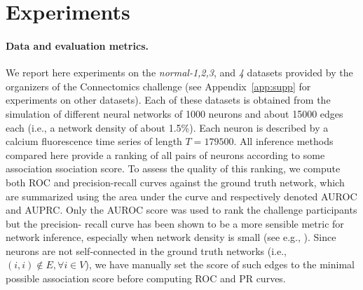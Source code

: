 \documentclass[wcp]{jmlr}
\begin{document}

\section{Experiments} \label{sec:results}


\paragraph{Data and evaluation metrics.}

We report here experiments on the \textit{normal-1,2,3}, and \textit{4}
datasets provided by the organizers of the Connectomics challenge (see
Appendix~\ref{app:supp} for experiments on other datasets). Each of
these datasets is obtained from the simulation \citep{stetter2012model} of
different neural networks of 1000 neurons and about 15000 edges each (i.e., a
network density of about 1.5\%). Each neuron is described by a calcium
fluorescence time series of length $T=179500$. All inference methods compared
here provide a ranking of all pairs of neurons according to some association
ssociation
score. To assess the quality of this ranking, we compute both ROC and
precision-recall curves against the ground truth network, which are summarized
using the area under the curve and respectively  denoted AUROC and AUPRC. Only
the AUROC score was used to rank the challenge participants but the precision-
recall curve has been shown to be a more sensible metric for network
inference, especially when network density is small (see e.g.,
\cite{schrynemackers2013protocols}). Since neurons are not self-connected in
the ground truth networks (i.e., $(i, i) \not \in E, \forall i \in V$), we
have manually set the score of such edges to the minimal possible association
score before computing ROC and PR curves.
\end{document}
